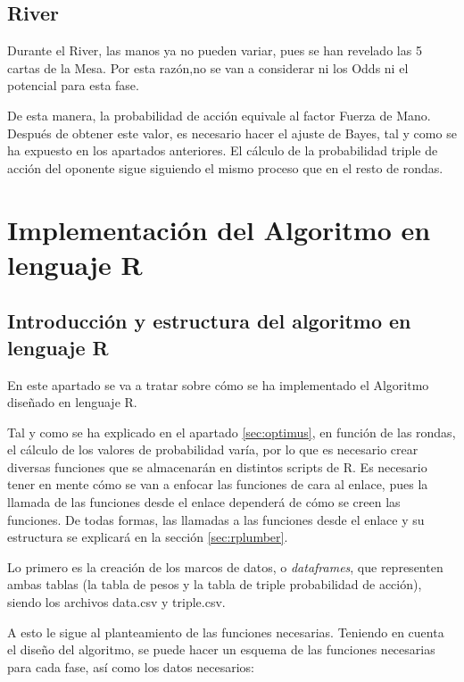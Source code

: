 \subsection{River}
\label{sec:river}

Durante el River, las manos ya no pueden variar, pues se han revelado las 5 cartas de la Mesa. Por esta razón,no se van a considerar ni los Odds ni el potencial para esta fase.

De esta manera,  la probabilidad de acción equivale al factor Fuerza de Mano.
 Después de obtener este valor, es necesario hacer el ajuste de Bayes, tal y como se ha expuesto en los apartados anteriores.
El cálculo de la probabilidad triple de acción del oponente sigue siguiendo el mismo proceso que en el resto de rondas.

\section{Implementación del Algoritmo en lenguaje R}
	
	\subsection{Introducción y estructura del algoritmo en lenguaje R}
	
	En este apartado se va a tratar sobre cómo se ha implementado el Algoritmo diseñado en lenguaje R.
	
	Tal y como se ha explicado en el apartado \ref{sec:optimus}, en función de las rondas, el cálculo de los valores de probabilidad varía, por lo que es necesario crear diversas funciones que se almacenarán en distintos scripts de R. Es necesario tener en mente cómo se van a enfocar las funciones de cara al enlace, pues la llamada de las funciones desde el enlace dependerá de cómo se creen las funciones. De todas formas, las llamadas a las funciones desde el enlace y su estructura se explicará en la sección \ref{sec:rplumber}.
	
	Lo primero es la creación de los marcos de datos, o \textit{dataframes}, que representen ambas tablas (la tabla de pesos y la tabla de triple probabilidad de acción), siendo los archivos data.csv y triple.csv.
	
	A esto le sigue al planteamiento de las funciones necesarias. Teniendo en cuenta el diseño del algoritmo, se puede hacer un esquema de las funciones necesarias para cada fase, así como los datos necesarios:
	
